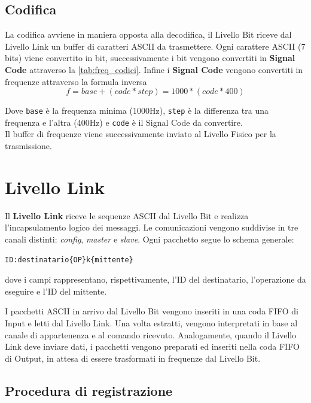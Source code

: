 \subsection{Codifica}
La codifica avviene in maniera opposta alla decodifica, il Livello Bit riceve dal Livello Link un buffer di caratteri ASCII da trasmettere.
Ogni carattere ASCII (7 bits) viene convertito in bit, successivamente i bit vengono convertiti in \textbf{Signal Code} attraverso la \autoref{tab:freq_codici}.
Infine i \textbf{Signal Code} vengono convertiti in frequenze attraverso la formula inversa
\begin{equation}
f = base + (code*step) = 1000 * (code*400)
\end{equation}

Dove \texttt{base} è la frequenza minima (1000Hz), \texttt{step} è la differenza tra una frequenza e l'altra (400Hz) e \texttt{code} è il Signal Code da convertire.\\

Il buffer di frequenze viene successivamente inviato al Livello Fisico per la trasmissione.

\section{Livello Link}
\label{sec:livello_link}

Il \textbf{Livello Link} riceve le sequenze ASCII dal Livello Bit e realizza l’incapsulamento logico dei messaggi. 
Le comunicazioni vengono suddivise in tre canali distinti: \emph{config}, \emph{master} e \emph{slave}. 
Ogni pacchetto segue lo schema generale:

\begin{verbatim}
ID:destinatario{OP}k{mittente}
\end{verbatim}

dove i campi rappresentano, rispettivamente, l’ID del destinatario, l’operazione da eseguire e l’ID del mittente.  

I pacchetti ASCII in arrivo dal Livello Bit vengono inseriti in una coda FIFO di Input e letti dal Livello Link. 
Una volta estratti, vengono interpretati in base al canale di appartenenza e al comando ricevuto. 
Analogamente, quando il Livello Link deve inviare dati, i pacchetti vengono preparati ed inseriti nella coda FIFO di Output, in attesa di essere trasformati in frequenze dal Livello Bit.

\subsection{Procedura di registrazione}
\label{subsec:registrazione}

